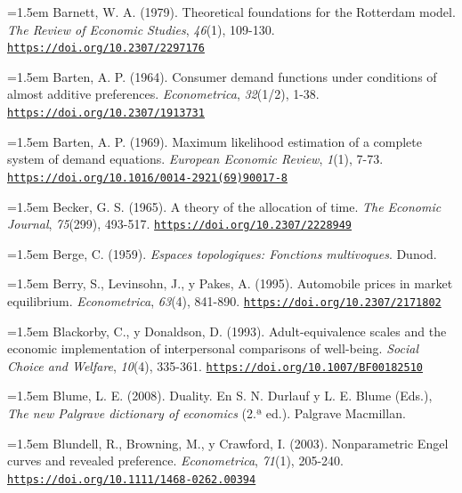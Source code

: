 \documentclass[10pt,a4paper]{article}
\begin{document}
\noindent\hangindent=1.5em Barnett, W. A. (1979). Theoretical foundations for the Rotterdam model. \textit{The Review of Economic Studies}, \textit{46}(1), 109-130. \href{https://doi.org/10.2307/2297176}{\nolinkurl{https://doi.org/10.2307/2297176}}

\noindent\hangindent=1.5em Barten, A. P. (1964). Consumer demand functions under conditions of almost additive preferences. \textit{Econometrica}, \textit{32}(1/2), 1-38. \href{https://doi.org/10.2307/1913731}{\nolinkurl{https://doi.org/10.2307/1913731}}

\noindent\hangindent=1.5em Barten, A. P. (1969). Maximum likelihood estimation of a complete system of demand equations. \textit{European Economic Review}, \textit{1}(1), 7-73. \href{https://doi.org/10.1016/0014-2921(69)90017-8}{\nolinkurl{https://doi.org/10.1016/0014-2921(69)90017-8}}

\noindent\hangindent=1.5em Becker, G. S. (1965). A theory of the allocation of time. \textit{The Economic Journal}, \textit{75}(299), 493-517. \href{https://doi.org/10.2307/2228949}{\nolinkurl{https://doi.org/10.2307/2228949}}

\noindent\hangindent=1.5em Berge, C. (1959). \textit{Espaces topologiques: Fonctions multivoques}. Dunod.

\noindent\hangindent=1.5em Berry, S., Levinsohn, J., y Pakes, A. (1995). Automobile prices in market equilibrium. \textit{Econometrica}, \textit{63}(4), 841-890. \href{https://doi.org/10.2307/2171802}{\nolinkurl{https://doi.org/10.2307/2171802}}

\noindent\hangindent=1.5em Blackorby, C., y Donaldson, D. (1993). Adult-equivalence scales and the economic implementation of interpersonal comparisons of well-being. \textit{Social Choice and Welfare}, \textit{10}(4), 335-361. \href{https://doi.org/10.1007/BF00182510}{\nolinkurl{https://doi.org/10.1007/BF00182510}}

\noindent\hangindent=1.5em Blume, L. E. (2008). Duality. En S. N. Durlauf y L. E. Blume (Eds.), \textit{The new Palgrave dictionary of economics} (2.ª ed.). Palgrave Macmillan.

\noindent\hangindent=1.5em Blundell, R., Browning, M., y Crawford, I. (2003). Nonparametric Engel curves and revealed preference. \textit{Econometrica}, \textit{71}(1), 205-240. \href{https://doi.org/10.1111/1468-0262.00394}{\nolinkurl{https://doi.org/10.1111/1468-0262.00394}}
\end{document}
